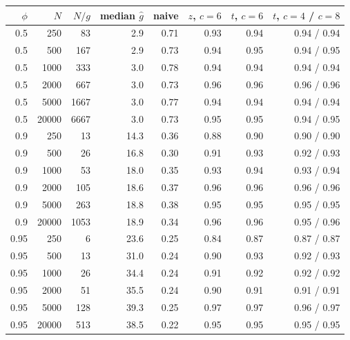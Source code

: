 \begin{tabular}{rrrrrrrr}
\toprule
$\phi$ & $N$ & $N/g$ & median $\hat g$ & naive & $z$, $c=6$ & $t$, $c=6$ & $t$, $c=4$ / $c=8$ \\
\midrule
0.5 & 250 & 83 & 2.9 & 0.71 & 0.93 & 0.94 & 0.94 / 0.94 \\
0.5 & 500 & 167 & 2.9 & 0.73 & 0.94 & 0.95 & 0.94 / 0.95 \\
0.5 & 1000 & 333 & 3.0 & 0.78 & 0.94 & 0.94 & 0.94 / 0.94 \\
0.5 & 2000 & 667 & 3.0 & 0.73 & 0.96 & 0.96 & 0.96 / 0.96 \\
0.5 & 5000 & 1667 & 3.0 & 0.77 & 0.94 & 0.94 & 0.94 / 0.94 \\
0.5 & 20000 & 6667 & 3.0 & 0.73 & 0.95 & 0.95 & 0.94 / 0.95 \\
0.9 & 250 & 13 & 14.3 & 0.36 & 0.88 & 0.90 & 0.90 / 0.90 \\
0.9 & 500 & 26 & 16.8 & 0.30 & 0.91 & 0.93 & 0.92 / 0.93 \\
0.9 & 1000 & 53 & 18.0 & 0.35 & 0.93 & 0.94 & 0.93 / 0.94 \\
0.9 & 2000 & 105 & 18.6 & 0.37 & 0.96 & 0.96 & 0.96 / 0.96 \\
0.9 & 5000 & 263 & 18.8 & 0.38 & 0.95 & 0.95 & 0.95 / 0.95 \\
0.9 & 20000 & 1053 & 18.9 & 0.34 & 0.96 & 0.96 & 0.95 / 0.96 \\
0.95 & 250 & 6 & 23.6 & 0.25 & 0.84 & 0.87 & 0.87 / 0.87 \\
0.95 & 500 & 13 & 31.0 & 0.24 & 0.90 & 0.93 & 0.92 / 0.93 \\
0.95 & 1000 & 26 & 34.4 & 0.24 & 0.91 & 0.92 & 0.92 / 0.92 \\
0.95 & 2000 & 51 & 35.5 & 0.24 & 0.90 & 0.91 & 0.91 / 0.91 \\
0.95 & 5000 & 128 & 39.3 & 0.25 & 0.97 & 0.97 & 0.96 / 0.97 \\
0.95 & 20000 & 513 & 38.5 & 0.22 & 0.95 & 0.95 & 0.95 / 0.95 \\
\bottomrule
\end{tabular}
